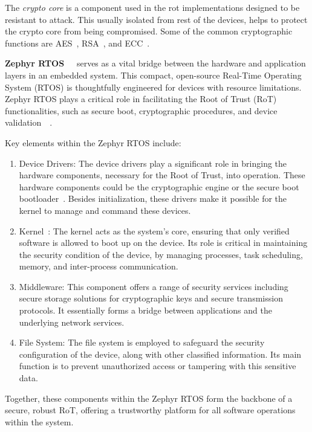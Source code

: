 The \textit{crypto core} is a component used in the \gls{rot} implementations
designed to be resistant to attack. This usually isolated from rest of the devices, helps
to protect the crypto core from being compromised. Some of the common cryptographic functions
are AES~\cite{nechvatal2001report}, RSA~\cite{milanov2009rsa}, and ECC~\cite{bos2014elliptic}.

\textbf{Zephyr RTOS\cite{Security75:online}~\cite{ZephyrPr4:online}~\cite{ZephyrPr92:online}}
serves as a vital bridge between the hardware and application layers in an embedded system.
This compact, open-source Real-Time Operating System (RTOS) is thoughtfully engineered for devices
with resource limitations. Zephyr RTOS plays a critical role in facilitating the Root of Trust (RoT)
functionalities, such as secure boot, cryptographic procedures,
and device validation\cite{Security75:online}~\cite{ZephyrPr4:online}~\cite{ZephyrPr92:online}.

Key elements within the Zephyr RTOS include:
\begin{enumerate}
\item Device Drivers: The device drivers play a significant role in bringing the hardware
components, necessary for the Root of Trust, into operation. These hardware components
could be the cryptographic engine or the secure boot bootloader~\cite{Bootload40:online}. Besides initialization,
these drivers make it possible for the kernel to manage and command these devices.
\item Kernel~\cite{Kernelin72:online}: The kernel acts as the system's core, ensuring that only verified software is allowed
to boot up on the device. Its role is critical in maintaining the security condition
of the device, by managing processes, task scheduling, memory, and inter-process communication.
\item Middleware: This component offers a range of security services including secure storage
solutions for cryptographic keys and secure transmission protocols. It essentially forms a bridge
between applications and the underlying network services.
\item File System: The file system is employed to safeguard the security configuration
of the device, along with other classified information. Its main function is to prevent
unauthorized access or tampering with this sensitive data.
\end{enumerate}
Together, these components within the Zephyr RTOS form the backbone of a secure, robust RoT,
offering a trustworthy platform for all software operations within the system.

